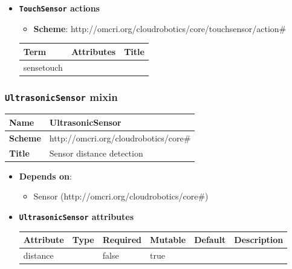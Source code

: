 \begin{itemize}
\item \textbf{\texttt{TouchSensor} actions}

\begin{itemize}
	\item \textbf{Scheme}: http://omcri.org/cloudrobotics/core/touchsensor/action\#
\end{itemize}

\begin{center}
\begin{tabular}{|l|l|l|}
  \hline
  \textbf{Term}  & \textbf{Attributes} & \textbf{Title} \\
  \hline  
  sensetouch & &  \\
  \hline
\end{tabular}
\end{center}
\end{itemize}

 
\subsubsection{\texttt{UltrasonicSensor} mixin}
\begin{center}
\begin{tabular}{|l|l|}
  \hline
  \textbf{Name} & UltrasonicSensor \\
  \hline  
  \textbf{Scheme} & http://omcri.org/cloudrobotics/core\# \\
  \hline
  \textbf{Title} & Sensor distance detection \\
  \hline
\end{tabular}
\end{center}

\begin{itemize}
\item \textbf{Depends on}:
\begin{itemize}
	\item Sensor (http://omcri.org/cloudrobotics/core\#)
\end{itemize}
\end{itemize}

\begin{itemize}
\item \textbf{\texttt{UltrasonicSensor} attributes}

\begin{tabularx}{\textwidth}{|l|l|p{1.4cm}|p{1.3cm}|l|X|}
  \hline
  \textbf{Attribute} & \textbf{Type} & \textbf{Required} & \textbf{Mutable} & \textbf{Default} & \textbf{Description} \\
  \hline  
  distance &  & false & true &  &  \\
  \hline
\end{tabularx}
\end{itemize}

